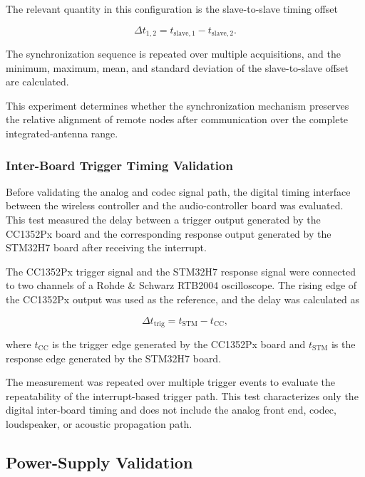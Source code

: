 The relevant quantity in this configuration is the slave-to-slave timing offset

\begin{equation}
    \Delta t_{1,2}
    =
    t_{\mathrm{slave},1}
    -
    t_{\mathrm{slave},2}.
\end{equation}

The synchronization sequence is repeated over multiple acquisitions, and the minimum, maximum, mean, and standard deviation of the slave-to-slave offset are calculated.

This experiment determines whether the synchronization mechanism preserves the relative alignment of remote nodes after communication over the complete integrated-antenna range.

\subsubsection{Inter-Board Trigger Timing Validation}

Before validating the analog and codec signal path, the digital timing interface between the wireless controller and the audio-controller board was evaluated. This test measured the delay between a trigger output generated by the CC1352Px board and the corresponding response output generated by the STM32H7 board after receiving the interrupt.

The CC1352Px trigger signal and the STM32H7 response signal were connected to two channels of a Rohde \& Schwarz RTB2004 oscilloscope. The rising edge of the CC1352Px output was used as the reference, and the delay was calculated as

\begin{equation}
    \Delta t_{\mathrm{trig}}
    =
    t_{\mathrm{STM}} - t_{\mathrm{CC}},
    \label{eq:inter_board_trigger_delay}
\end{equation}

where \(t_{\mathrm{CC}}\) is the trigger edge generated by the CC1352Px board and \(t_{\mathrm{STM}}\) is the response edge generated by the STM32H7 board.

The measurement was repeated over multiple trigger events to evaluate the repeatability of the interrupt-based trigger path. This test characterizes only the digital inter-board timing and does not include the analog front end, codec, loudspeaker, or acoustic propagation path.


\subsection{Power-Supply Validation}
\label{sec:power_supply_validation}

